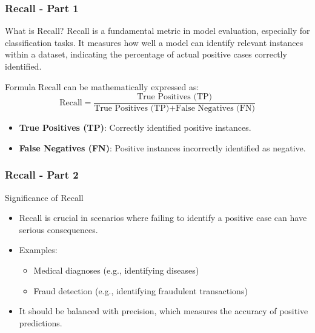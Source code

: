 \documentclass[aspectratio=169]{beamer}
\begin{document}
\begin{frame}[fragile]
    \frametitle{Recall - Part 1}
    \begin{block}{What is Recall?}
        Recall is a fundamental metric in model evaluation, especially for classification tasks. 
        It measures how well a model can identify relevant instances within a dataset, indicating the percentage of actual positive cases correctly identified.
    \end{block}

    \begin{block}{Formula}
        Recall can be mathematically expressed as:
        \begin{equation}
            \text{Recall} = \frac{\text{True Positives (TP)}}{\text{True Positives (TP)} + \text{False Negatives (FN)}}
        \end{equation}
    \end{block}
    
    \begin{itemize}
        \item \textbf{True Positives (TP)}: Correctly identified positive instances.
        \item \textbf{False Negatives (FN)}: Positive instances incorrectly identified as negative.
    \end{itemize}
\end{frame}

\begin{frame}[fragile]
    \frametitle{Recall - Part 2}
    \begin{block}{Significance of Recall}
        \begin{itemize}
            \item Recall is crucial in scenarios where failing to identify a positive case can have serious consequences.
            \item Examples:
                \begin{itemize}
                    \item Medical diagnoses (e.g., identifying diseases)
                    \item Fraud detection (e.g., identifying fraudulent transactions)
                \end{itemize}
            \item It should be balanced with precision, which measures the accuracy of positive predictions.
        \end{itemize}
    \end{block}
\end{frame}
\end{document}
